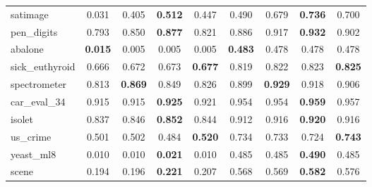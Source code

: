 \begin{figure}[ht]
\begin{tabular}{p{22mm}|*4{p{14mm}}|*4{p{14mm}}}
        satimage&\multicolumn{1}{c}{0.031}&\multicolumn{1}{c}{0.405}&\multicolumn{1}{c}{\textbf{0.512}}&\multicolumn{1}{c|}{0.447}&\multicolumn{1}{c}{0.490}&\multicolumn{1}{c}{0.679}&\multicolumn{1}{c}{\textbf{0.736}}&\multicolumn{1}{c}{0.700}\\
        pen\_digits&\multicolumn{1}{c}{0.793}&\multicolumn{1}{c}{0.850}&\multicolumn{1}{c}{\textbf{0.877}}&\multicolumn{1}{c|}{0.821}&\multicolumn{1}{c}{0.886}&\multicolumn{1}{c}{0.917}&\multicolumn{1}{c}{\textbf{0.932}}&\multicolumn{1}{c}{0.902}\\
        abalone&\multicolumn{1}{c}{\textbf{0.015}}&\multicolumn{1}{c}{0.005}&\multicolumn{1}{c}{0.005}&\multicolumn{1}{c|}{0.005}&\multicolumn{1}{c}{\textbf{0.483}}&\multicolumn{1}{c}{0.478}&\multicolumn{1}{c}{0.478}&\multicolumn{1}{c}{0.478}\\
        sick\_euthyroid&\multicolumn{1}{c}{0.666}&\multicolumn{1}{c}{0.672}&\multicolumn{1}{c}{0.673}&\multicolumn{1}{c|}{\textbf{0.677}}&\multicolumn{1}{c}{0.819}&\multicolumn{1}{c}{0.822}&\multicolumn{1}{c}{0.823}&\multicolumn{1}{c}{\textbf{0.825}}\\
        spectrometer&\multicolumn{1}{c}{0.813}&\multicolumn{1}{c}{\textbf{0.869}}&\multicolumn{1}{c}{0.849}&\multicolumn{1}{c|}{0.826}&\multicolumn{1}{c}{0.899}&\multicolumn{1}{c}{\textbf{0.929}}&\multicolumn{1}{c}{0.918}&\multicolumn{1}{c}{0.906}\\
        car\_eval\_34&\multicolumn{1}{c}{0.915}&\multicolumn{1}{c}{0.915}&\multicolumn{1}{c}{\textbf{0.925}}&\multicolumn{1}{c|}{0.921}&\multicolumn{1}{c}{0.954}&\multicolumn{1}{c}{0.954}&\multicolumn{1}{c}{\textbf{0.959}}&\multicolumn{1}{c}{0.957}\\
        isolet&\multicolumn{1}{c}{0.837}&\multicolumn{1}{c}{0.846}&\multicolumn{1}{c}{\textbf{0.852}}&\multicolumn{1}{c|}{0.844}&\multicolumn{1}{c}{0.912}&\multicolumn{1}{c}{0.916}&\multicolumn{1}{c}{\textbf{0.920}}&\multicolumn{1}{c}{0.916}\\
        us\_crime&\multicolumn{1}{c}{0.501}&\multicolumn{1}{c}{0.502}&\multicolumn{1}{c}{0.484}&\multicolumn{1}{c|}{\textbf{0.520}}&\multicolumn{1}{c}{0.734}&\multicolumn{1}{c}{0.733}&\multicolumn{1}{c}{0.724}&\multicolumn{1}{c}{\textbf{0.743}}\\
        yeast\_ml8&\multicolumn{1}{c}{0.010}&\multicolumn{1}{c}{0.010}&\multicolumn{1}{c}{\textbf{0.021}}&\multicolumn{1}{c|}{0.010}&\multicolumn{1}{c}{0.485}&\multicolumn{1}{c}{0.485}&\multicolumn{1}{c}{\textbf{0.490}}&\multicolumn{1}{c}{0.485}\\
        scene&\multicolumn{1}{c}{0.194}&\multicolumn{1}{c}{0.196}&\multicolumn{1}{c}{\textbf{0.221}}&\multicolumn{1}{c|}{0.207}&\multicolumn{1}{c}{0.568}&\multicolumn{1}{c}{0.569}&\multicolumn{1}{c}{\textbf{0.582}}&\multicolumn{1}{c}{0.576}\\

\end{tabular}
\end{figure}
